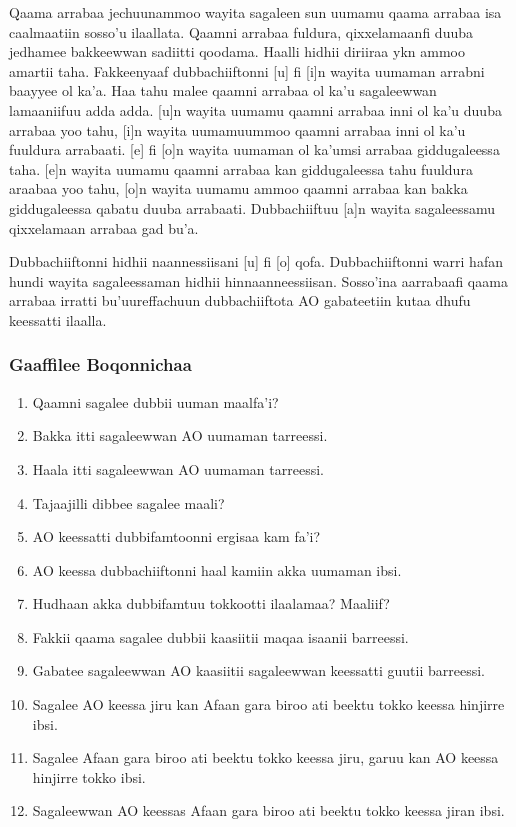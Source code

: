 \documentclass[11pt,b5paper]{book}
\begin{document}
Qaama arrabaa jechuunammoo wayita sagaleen sun uumamu  qaama arrabaa isa caalmaatiin sosso'u ilaallata. Qaamni  arrabaa fuldura, qixxelamaanfi duuba jedhamee bakkeewwan  sadiitti qoodama. Haalli hidhii diriiraa ykn ammoo amartii  taha. Fakkeenyaaf dubbachiiftonni [u] fi [i]n wayita uumaman  arrabni baayyee ol ka'a. Haa tahu malee qaamni arrabaa ol  ka'u sagaleewwan lamaaniifuu adda adda. [u]n wayita  uumamu qaamni arrabaa inni ol ka'u duuba arrabaa yoo tahu,  [i]n wayita uumamuummoo qaamni arrabaa inni ol ka'u  fuuldura arrabaati. [e] fi [o]n wayita uumaman ol ka'umsi  arrabaa giddugaleessa taha. [e]n wayita uumamu qaamni  arrabaa kan giddugaleessa tahu fuuldura araabaa yoo tahu,  [o]n wayita uumamu ammoo qaamni arrabaa kan bakka  giddugaleessa qabatu duuba arrabaati. Dubbachiiftuu [a]n  wayita sagaleessamu qixxelamaan arrabaa gad bu'a. 

Dubbachiiftonni hidhii naannessiisani [u] fi [o] qofa.  Dubbachiiftonni warri hafan hundi wayita sagaleessaman hidhii  hinnaanneessiisan. Sosso'ina aarrabaafi qaama arrabaa irratti  bu'uureffachuun dubbachiiftota AO gabateetiin kutaa dhufu  keessatti ilaalla. 

\subsubsection{Gaaffilee Boqonnichaa}

\begin{enumerate}
  \item Qaamni sagalee dubbii uuman maalfa’i?
  \item Bakka itti sagaleewwan AO uumaman tarreessi.
  \item Haala itti sagaleewwan AO uumaman tarreessi.
  \item Tajaajilli dibbee sagalee maali?
  \item AO keessatti dubbifamtoonni ergisaa kam fa’i?
  \item AO keessa dubbachiiftonni haal kamiin akka uumaman ibsi.
  \item Hudhaan akka dubbifamtuu tokkootti ilaalamaa? Maaliif?
  \item Fakkii qaama sagalee dubbii kaasiitii maqaa isaanii  barreessi.
  \item Gabatee sagaleewwan AO kaasiitii sagaleewwan keessatti  guutii barreessi.
  \item Sagalee AO keessa jiru kan Afaan gara biroo ati beektu  tokko keessa hinjirre ibsi.
  \item Sagalee Afaan gara biroo ati beektu tokko keessa jiru,  garuu kan AO keessa hinjirre tokko ibsi.
  \item Sagaleewwan AO keessas Afaan gara biroo ati beektu tokko  keessa jiran ibsi.
  \end{enumerate}
\end{document}
